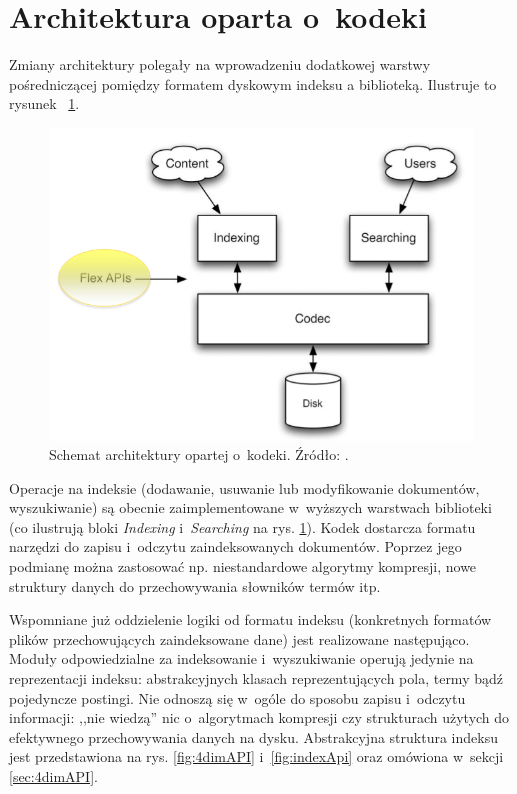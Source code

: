 \section{Architektura oparta o~kodeki}

Zmiany architektury polegały na wprowadzeniu dodatkowej warstwy pośredniczącej pomiędzy formatem dyskowym indeksu a biblioteką. Ilustruje to rysunek ~\ref{fig:newarchitecture}.

\begin{figure}[here]
 \includegraphics[scale=0.5]{pictures/architecture.png}
 \caption{Schemat architektury opartej o~kodeki. Źródło: \cite{flexindex}.\label{fig:newarchitecture}}
\end{figure}

Operacje na indeksie (dodawanie, usuwanie lub modyfikowanie dokumentów, wyszukiwanie) są obecnie zaimplementowane w~wyższych warstwach biblioteki (co ilustrują bloki \emph{Indexing} i~\emph{Searching} na rys. \ref{fig:newarchitecture}). Kodek dostarcza formatu narzędzi do zapisu i~odczytu zaindeksowanych dokumentów. Poprzez jego podmianę można zastosować np. niestandardowe algorytmy kompresji, nowe struktury danych do przechowywania słowników termów itp.

Wspomniane już oddzielenie logiki od formatu indeksu (konkretnych formatów plików przechowujących zaindeksowane dane) jest realizowane następująco. Moduły odpowiedzialne za indeksowanie i~wyszukiwanie operują jedynie na reprezentacji indeksu: abstrakcyjnych klasach reprezentujących pola, termy bądź pojedyncze postingi. Nie odnoszą się w~ogóle do sposobu zapisu i~odczytu informacji: ,,nie wiedzą'' nic o~algorytmach kompresji czy strukturach użytych do efektywnego przechowywania danych na dysku. Abstrakcyjna struktura indeksu jest przedstawiona na rys. \ref{fig:4dimAPI} i~\ref{fig:indexApi} oraz omówiona w~sekcji \ref{sec:4dimAPI}.

